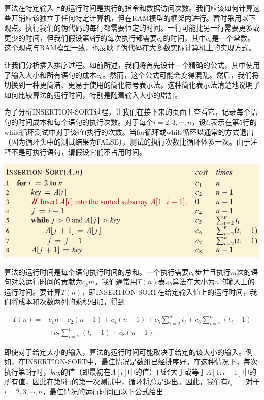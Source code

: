 \documentclass[lang=cn,newtx,10pt,scheme=chinese]{elegantbook}
\begin{document}
算法在特定输入上的运行时间是执行的指令和数据访问次数。我们应该如何计算这些开销应该独立于任何特定计算机，但在RAM模型的框架内进行。暂时采用以下观点。执行我们的伪代码的每行都需要恒定的时间。一行可能比另一行需要更多或更少的时间，但我们假设第$k$行的每次执行都需要$c_k$的时间，其中$c_k$是一个常数。这个观点与RAM模型一致，也反映了伪代码在大多数实际计算机上的实现方式。

让我们分析插入排序过程。如前所述，我们将首先设计一个精确的公式，其中使用了输入大小和所有语句的成本$c_k$。然而，这个公式可能会变得混乱。然后，我们将切换到一种更简洁、更易于使用的简化符号表示法。这种简化表示法清楚地说明了如何比较算法的运行时间，特别是随着输入大小的增加。

为了分析INSERTION-SORT过程，让我们在接下来的页面上查看它，记录每个语句的时间成本和每个语句的执行次数。对于每个$i=2,3,\cdots,n$，设$t_i$表示在第5行的while循环测试中对于该$i$值执行的次数。当for循环或while循环以通常的方式退出（因为循环头中的测试结果为FALSE），测试的执行次数比循环体多一次。由于注释不是可执行语句，请假设它们不占用时间。

\includegraphics{算法导论第四版插图/第二章/插入排序时间复杂度的代码.pdf}

算法的运行时间是每个语句执行时间的总和。一个执行需要$c_k$步并且执行$m$次的语句对总运行时间的贡献为$c_km$。我们通常用$T(n)$表示算法在大小为$n$的输入上的运行时间。要计算$T(n)$，即INSERTION-SORT在给定输入值上的运行时间，我们将成本和次数两列的乘积相加，得到

\begin{equation*}
\begin{aligned}
T(n)= & c_1 n+c_2(n-1)+c_4(n-1)+c_5 \sum_{i=2}^n t_i+c_6 \sum_{i=2}^n\left(t_i-1\right) \\
& +c_7 \sum_{i=2}^n\left(t_i-1\right)+c_8(n-1) .
\end{aligned}
\end{equation*}

即使对于给定大小的输入，算法的运行时间可能取决于给定的该大小的输入。例如，在INSERTION-SORT中，最佳情况是数组已经排序好。在这种情况下，每次执行第5行时，$key$的值（即最初在$A[i]$中的值）已经大于或等于$A[1:i-1]$中的所有值，因此在第5行的第一次测试中，循环将总是退出。因此，我们有$t_i=1$对于$i=2,3,\cdots,n$，最佳情况的运行时间由以下公式给出
\end{document}
